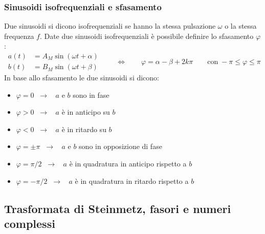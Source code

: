 \documentclass[a4paper]{article}
\begin{document}
\subsubsection*{Sinusoidi isofrequenziali e sfasamento}
Due sinusoidi si dicono isofrequenziali se hanno la stessa pulsazione \(\omega\) o la stessa frequenza \(f\). Date due sinusoidi
isofrequenziali è possibile definire lo sfasamento \(\varphi\):
\[\begin{aligned} a(t) &= A_M \sin (\omega t + \alpha) \\ b(t) &= B_M \sin (\omega t + \beta) \end{aligned}
\qquad \Leftrightarrow \qquad \varphi = \alpha - \beta + 2 k \pi \qquad \text{con} \; -\pi \leq \varphi \leq \pi\]
In base allo sfasamento le due sinusoidi si dicono:
\begin{center}
	\begin{minipage}{0.35\textwidth}
		\begin{itemize}
			\item \(\varphi = 0 \;\; \rightarrow \;\;\) \(a\) e \(b\) sono in fase
			\item \(\varphi > 0 \;\; \rightarrow \;\;\) \(a\) è in anticipo su \(b\)
			\item \(\varphi < 0 \;\; \rightarrow \;\;\) \(a\) è in ritardo su \(b\)
		\end{itemize}
	\end{minipage}
	\begin{minipage}{0.6\textwidth}
		\begin{itemize}
			\item \(\varphi = \pm \pi \;\; \rightarrow \;\;\) \(a\) e \(b\) sono in opposizione di fase
			\item \(\varphi = \pi/2 \;\; \rightarrow \;\;\) \(a\) è in quadratura in anticipo rispetto a \(b\)
			\item \(\varphi = -\pi/2 \;\; \rightarrow \;\;\) \(a\) è in quadratura in ritardo rispetto a \(b\)
		\end{itemize}
	\end{minipage}
\end{center}

\newpage

\subsection{Trasformata di Steinmetz, fasori e numeri complessi}
\end{document}
